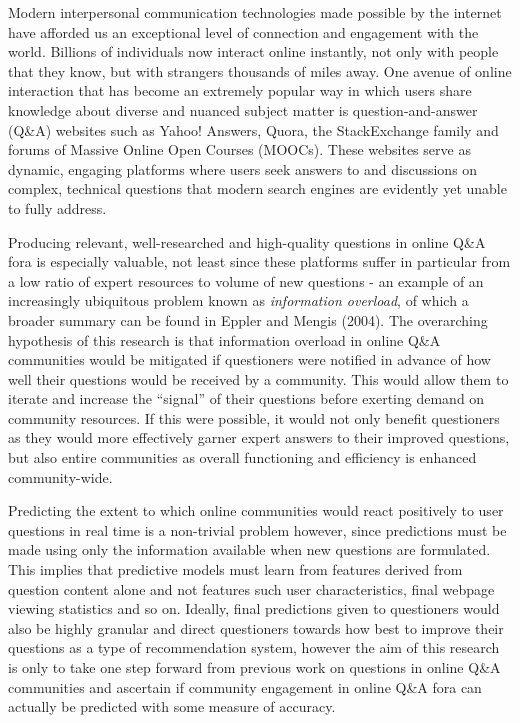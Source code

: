 \documentclass[11pt,preprint, authoryear]{article}
\begin{document}
Modern interpersonal communication technologies made possible by the
internet have afforded us an exceptional level of connection and
engagement with the world. Billions of individuals now interact online
instantly, not only with people that they know, but with strangers
thousands of miles away. One avenue of online interaction that has
become an extremely popular way in which users share knowledge about
diverse and nuanced subject matter is question-and-answer (Q\&A)
websites such as Yahoo! Answers, Quora, the StackExchange family and
forums of Massive Online Open Courses (MOOCs). These websites serve as
dynamic, engaging platforms where users seek answers to and discussions
on complex, technical questions that modern search engines are evidently
yet unable to fully address.

Producing relevant, well-researched and high-quality questions in online
Q\&A fora is especially valuable, not least since these platforms suffer
in particular from a low ratio of expert resources to volume of new
questions - an example of an increasingly ubiquitous problem known as
\emph{information overload}, of which a broader summary can be found in
Eppler and Mengis (2004). The overarching hypothesis of this research is
that information overload in online Q\&A communities would be mitigated
if questioners were notified in advance of how well their questions
would be received by a community. This would allow them to iterate and
increase the ``signal'' of their questions before exerting demand on
community resources. If this were possible, it would not only benefit
questioners as they would more effectively garner expert answers to
their improved questions, but also entire communities as overall
functioning and efficiency is enhanced community-wide.

Predicting the extent to which online communities would react positively
to user questions in real time is a non-trivial problem however, since
predictions must be made using only the information available when new
questions are formulated. This implies that predictive models must learn
from features derived from question content alone and not features such
user characteristics, final webpage viewing statistics and so on.
Ideally, final predictions given to questioners would also be highly
granular and direct questioners towards how best to improve their
questions as a type of recommendation system, however the aim of this
research is only to take one step forward from previous work on
questions in online Q\&A communities and ascertain if community
engagement in online Q\&A fora can actually be predicted with some
measure of accuracy.
\end{document}
